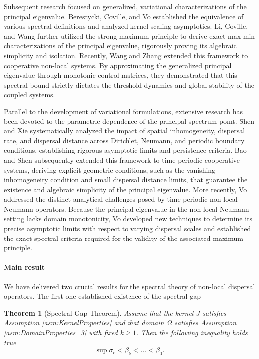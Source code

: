 \documentclass[12pt, a4paper]{article}
\theoremstyle{break}
\newtheorem{thm}{Theorem}[section]
\theoremstyle{break}
\theoremstyle{break}
\theoremstyle{break}
\theoremstyle{break}
\theoremstyle{break}
\theoremstyle{break}
\theoremstyle{break}
\theoremstyle{break}
\begin{document}
Subsequent research focused on generalized, variational characterizations of the principal eigenvalue. Berestycki, Coville, and Vo \cite{BerestyckiCovilleVo2016} established the equivalence of various spectral definitions and analyzed kernel scaling asymptotics. Li, Coville, and Wang \cite{LiCovilleWang2017} further utilized the strong maximum principle to derive exact max-min characterizations of the principal eigenvalue, rigorously proving its algebraic simplicity and isolation. Recently, Wang and Zhang \cite{WangZhang2026} extended this framework to cooperative non-local systems. By approximating the generalized principal eigenvalue through monotonic control matrices, they demonstrated that this spectral bound strictly dictates the threshold dynamics and global stability of the coupled systems.

Parallel to the development of variational formulations, extensive research has been devoted to the parametric dependence of the principal spectrum point. Shen and Xie \cite{ShenXie2015} systematically analyzed the impact of spatial inhomogeneity, dispersal rate, and dispersal distance across Dirichlet, Neumann, and periodic boundary conditions, establishing rigorous asymptotic limits and persistence criteria. Bao and Shen \cite{BaoShen2016} subsequently extended this framework to time-periodic cooperative systems, deriving explicit geometric conditions, such as the vanishing inhomogeneity condition and small dispersal distance limits, that guarantee the existence and algebraic simplicity of the principal eigenvalue. More recently, Vo \cite{Vo2022} addressed the distinct analytical challenges posed by time-periodic non-local Neumann operators. Because the principal eigenvalue in the non-local Neumann setting lacks domain monotonicity, Vo developed new techniques to determine its precise asymptotic limits with respect to varying dispersal scales and established the exact spectral criteria required for the validity of the associated maximum principle.

\paragraph{Main result}

We have delivered two crucial results for the spectral theory of non-local dispersal operators. The first one established existence of the spectral gap

\begin{thm}[Spectral Gap Theorem]
    \label{thm:spectral_gap_theorem}
    Assume that the kernel $J$ satisfies Assumption \ref{asm:KernelProperties} and that domain $\Omega$ satisfies Assumption \ref{asm:DomainProperties_3} with fixed $k \geq 1$. Then the following inequality holds true
    \begin{equation}
        \sup \sigma_c < \beta_k < \ldots < \beta_0.
    \end{equation}
\end{thm}
\end{document}
